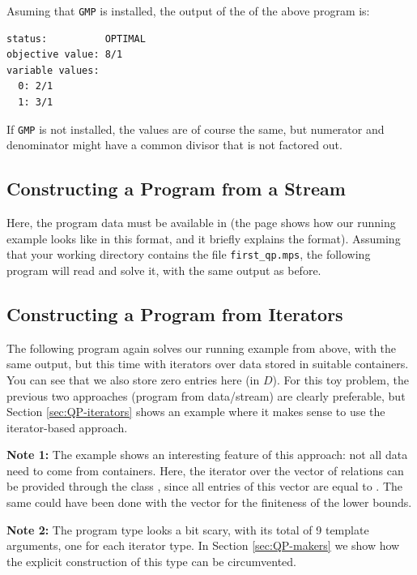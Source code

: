 
Asuming that \texttt{GMP} is installed, the 
output of the of the above program is:
\begin{verbatim}
status:          OPTIMAL
objective value: 8/1
variable values:
  0: 2/1
  1: 3/1
\end{verbatim}
If \texttt{GMP} is not installed, the values are of course the same, 
but numerator and denominator might have a common divisor that is not
factored out.  

\subsection{Constructing a Program from a Stream}
Here, the program data must be available in  (the
 page shows how our running example looks like in
this format, and it briefly explains the format). Assuming that
your working directory contains the file \texttt{first\_qp.mps},
the following program will read and solve it, with the same output
as before.


\subsection{Constructing a Program from Iterators}
The following program again solves our running example from above,
with the same output, but this time with iterators over data stored 
in suitable containers. You can see that we also store zero 
entries here (in $D$). For this toy problem, the previous two
approaches (program from data/stream) are clearly preferable, 
but Section \ref{sec:QP-iterators} shows an
example where it makes sense to use the iterator-based approach.


{\bf Note 1:} The example shows an interesting feature of this approach:
not all data need to come from containers. Here, the iterator over the
vector of relations can be provided through the class
, since all entries of this vector
are equal to . The same could have been done with
the vector  for the finiteness of the lower bounds. 

{\bf Note 2:} The program type looks a bit scary, with its total of
9 template arguments, one for each iterator type. In Section
\ref{sec:QP-makers} we show how the explicit construction of
this type can be circumvented.

